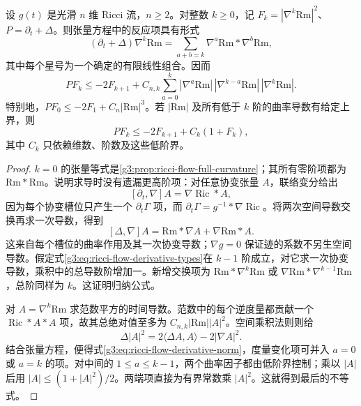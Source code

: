 \begin{lemma}\label{g3:lem:ricci-flow-derivative-evolution}
	设 \(g(t)\) 是光滑 \(n\) 维 Ricci 流，\(n\ge2\)。对整数 \(k\ge0\)，记
	\(F_k=|\nabla^k\mathrm{Rm}|^2\)、\(P=\partial_t+\Delta\)。则张量方程中的反应项具有形式
	\begin{equation}\label{g3:eq:ricci-flow-derivative-types}
		(\partial_t+\Delta)\nabla^k\mathrm{Rm}
		=\sum_{a+b=k}\nabla^a\mathrm{Rm}*\nabla^b\mathrm{Rm},
	\end{equation}
	其中每个星号为一个确定的有限线性组合。因而
	\begin{equation}\label{g3:eq:ricci-flow-derivative-norm}
		PF_k\le-2F_{k+1}
		+C_{n,k}\sum_{a=0}^k
		|\nabla^a\mathrm{Rm}|\,
		|\nabla^{k-a}\mathrm{Rm}|\,|\nabla^k\mathrm{Rm}|.
	\end{equation}
	特别地，\(PF_0\le-2F_1+C_n|\mathrm{Rm}|^3\)。若 \(|\mathrm{Rm}|\) 及所有低于 \(k\) 阶的曲率导数有给定上界，则
	\begin{equation}\label{g3:eq:ricci-flow-derivative-inductive-bound}
		PF_k\le-2F_{k+1}+C_k(1+F_k),
	\end{equation}
	其中 \(C_k\) 只依赖维数、阶数及这些低阶界。
\end{lemma}
\begin{proof}
	\(k=0\) 的张量等式是\cref{g3:prop:ricci-flow-full-curvature}；其所有零阶项都为 \(\mathrm{Rm}*\mathrm{Rm}\)。说明求导时没有遗漏更高阶项：对任意协变张量 \(A\)，联络变分给出
	\[
		[\partial_t,\nabla]A=\nabla\operatorname{Ric}*A,
	\]
	因为每个协变槽位只产生一个 \(\partial_t\Gamma\) 项，而 \(\partial_t\Gamma=g^{-1}*\nabla\operatorname{Ric}\)。将两次空间导数交换再求一次导数，得到
	\[
		[\Delta,\nabla]A
		=\mathrm{Rm}*\nabla A+\nabla\mathrm{Rm}*A.
	\]
	这来自每个槽位的曲率作用及其一次协变导数；\(\nabla g=0\) 保证迹的系数不另生空间导数。假定式\eqref{g3:eq:ricci-flow-derivative-types}在 \(k-1\) 阶成立，对它求一次协变导数，乘积中的总导数阶增加一。新增交换项为
	\(\mathrm{Rm}*\nabla^k\mathrm{Rm}\) 或
	\(\nabla\mathrm{Rm}*\nabla^{k-1}\mathrm{Rm}\)，总阶同样为 \(k\)。这证明归纳公式。

	对 \(A=\nabla^k\mathrm{Rm}\) 求范数平方的时间导数。范数中的每个逆度量都贡献一个 \(\operatorname{Ric}*A*A\) 项，故其总绝对值至多为 \(C_{n,k}|\mathrm{Rm}||A|^2\)。空间乘积法则则给
	\[
		\Delta|A|^2=2\langle\Delta A,A\rangle-2|\nabla A|^2.
	\]
	结合张量方程，便得式\eqref{g3:eq:ricci-flow-derivative-norm}，度量变化项可并入 \(a=0\) 或 \(a=k\) 的项。对中间的 \(1\le a\le k-1\)，两个曲率因子都由低阶界控制；乘以 \(|A|\) 后用 \(|A|\le(1+|A|^2)/2\)。两端项直接为有界常数乘 \(|A|^2\)。这就得到最后的不等式。
\end{proof}

